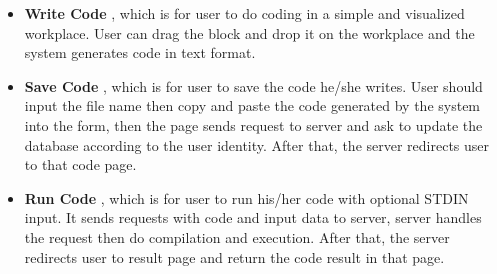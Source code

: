 \begin{itemize}

\item
\textbf{Write Code}
, which is for user to do coding in a simple and visualized workplace. User can drag the block and drop it on the workplace and the system generates code in text format.\newline

\item
\textbf{Save Code}
, which is for user to save the code he/she writes. User should input the file name then copy and paste the code generated by the system into the form, then the page sends request to server and ask to update the database according to the user identity. After that, the server redirects user to that code page.

\item
\textbf{Run Code}
, which is for user to run his/her code with optional STDIN input. It sends requests with code and input data to server, server handles the request then do compilation and execution. After that, the server redirects user to result page and return the code result in that page.

\end{itemize}

